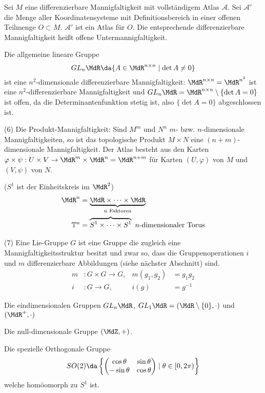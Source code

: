 \documentclass[a4paper,twoside,DIV15,BCOR12mm]{scrbook}
\newcommand{\At}{\mathcal A}
\begin{document}
\begin{beispiele}
Sei $M$ eine differenzierbare Mannigfaltigkeit mit vollständigem Atlas $\At$. Sei $\At'$ die Menge aller Koordinatensysteme mit Definitionsbereich in einer offenen Teilmenge $O\subset M$. $\At'$ ist ein Atlas für $O$. Die entsprechende differenzierbare Mannigfaltigkeit heißt offene Untermannigfaltigkeit.

\begin{beispiel}
Die allgemeine lineare Gruppe
\[ GL_n\MdR \da \{ A \in \MdR^{n\times n} \mid \det A \ne 0 \} \]
ist eine $n^2$-dimensionale differenzierbare Mannigfaltigkeit:
$\MdR^{n\times n} = \MdR^{n^2}$ ist eine $n^2$-differenzierbare Mannigfaltigkeit und $GL_n\MdR = \MdR^{n\times n} \setminus \{\det A = 0\}$ ist offen, da die Determinantenfunktion stetig ist, also  $\{\det A = 0\}$ abgeschlossen ist.
\end{beispiel}

\item[(6)] Die Produkt-Mannigfaltigkeit:
Sind $M^m$ und $N^n$ $m$- bzw. $n$-dimensionale Mannigfaltigkeiten, so ist das topologische Produkt $M\times N$ eine $(n+m)$-dimensionale Mannigfaltigkeit. Der Atlas besteht aus den Karten $\varphi\times \psi: U\times V \to \MdR^m\times\MdR^n = \MdR^{n+m}$ für Karten $(U,\varphi)$ von $M$ und $(V,\psi)$ von $N$.

\begin{beispiel}
($S^1$ ist der Einheitskreis im $\MdR^2$)
\begin{align*}
\MdR^n &= \underbrace{\MdR\times \cdots \times \MdR}_{\text{$n$ Faktoren}} \\
\mathbb{T}^n &= \overbrace{S^1\times \cdots \times S^1} \text{ $n$-dimensionaler Torus}
\end{align*}
\end{beispiel}

\item[(7)] Eine Lie-Gruppe $G$ ist eine Gruppe die zugleich eine Mannigfaltigkeitsstruktur besitzt und zwar so, dass die Gruppenoperationen $i$ und $m$ differenzierbare Abbildungen (siehe nächster Abschnitt) sind. 
\begin{align*}
m&: G\times G \to G , &m(g_1,g_2) &= g_1g_2 \\
i&: G \to G , &i(g) &= g^{-1} 
\end{align*}
\begin{beispiele}
\item Die eindimensionalen Gruppen $GL_n\MdR$, $GL_1\MdR = (\MdR\setminus\{0\},\cdot)$ und  $(\MdR^+,\cdot)$ 
\item Die null-dimensionale Gruppe $(\MdZ,+)$.
\item Die spezielle Orthogonale Gruppe 
\[ SO(2) \da \left\{
\begin{pmatrix}
\cos \theta & \sin \theta \\ -\sin \theta & \cos \theta \end{pmatrix} \mid \theta \in [0,2\pi) \right\} \]
welche homöomorph zu $S^1$ ist.


\end{beispiele}
\end{beispiele}
\end{document}
